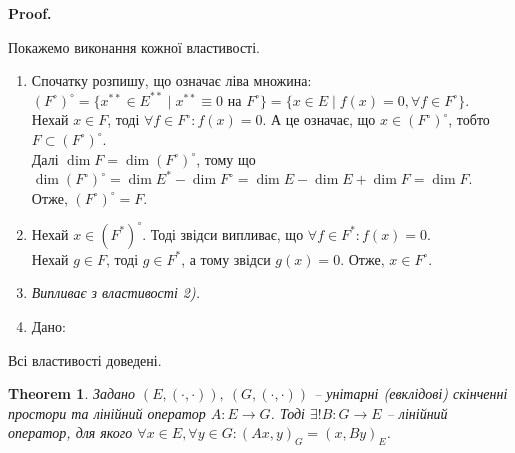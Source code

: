 \documentclass[a4paper, 10pt]{article}
\makeatletter
\theoremstyle{theoremdd}
\newtheorem{theorem}{Theorem}[subsection]
\renewenvironment{proof}[1][Proof.\\]{\par
\pushQED{\hfill \qed}%
\normalfont \topsep6\p@\@plus6\p@\relax
\trivlist
\item\relax
{\bfseries
#1\@addpunct{.}}\hspace\labelsep\ignorespaces
}{%
\popQED\endtrivlist\@endpefalse
}
\makeatother
\begin{document}
\begin{proof}
Покажемо виконання кожної властивості.
\begin{enumerate}[topsep=-\parskip, wide=0pt, label={\arabic*)}]
\item Спочатку розпишу, що означає ліва множина:\\
$(F^\circ)^\circ = \{ x^{**} \in E^{**} \mid x^{**} \equiv 0 \text{ на } F^\circ \} = \{x \in E \mid f(x) = 0, \forall f \in F^\circ\}$.\\
Нехай $x \in F$, тоді $\forall f \in F^\circ : f(x) = 0$. А це означає, що $x \in (F^\circ)^\circ$, тобто $F \subset (F^\circ)^\circ$.\\
Далі $\dim F = \dim (F^\circ)^\circ$, тому що $\dim (F^{\circ})^\circ = \dim E^* - \dim F^\circ = \dim E - \dim E + \dim F = \dim F$.\\
Отже, $(F^{\circ})^{\circ} = F$.
\item Нехай $x \in (F^*)^\circ$. Тоді звідси випливає, що $\forall f \in F^*: f(x) = 0$.\\
Нехай $g \in F$, тоді $g \in F^*$, а тому звідси $g(x) = 0$. Отже, $x \in F^\circ$.
\item \textit{Випливає з властивості 2).}
\item Дано:
\end{enumerate}
Всі властивості доведені.
\end{proof}
\fi

\begin{theorem} Задано $(E,(\cdot,\cdot)),\ (G,(\cdot,\cdot))$ -- унітарні (евклідові) скінченні простори та лінійний оператор $A \colon E \to G$. Тоді $\exists! B \colon G \to E$ -- лінійний оператор, для якого $\forall x \in E, \forall y \in G: (Ax,y)_G = (x,By)_E$.
\end{theorem}
\end{document}
